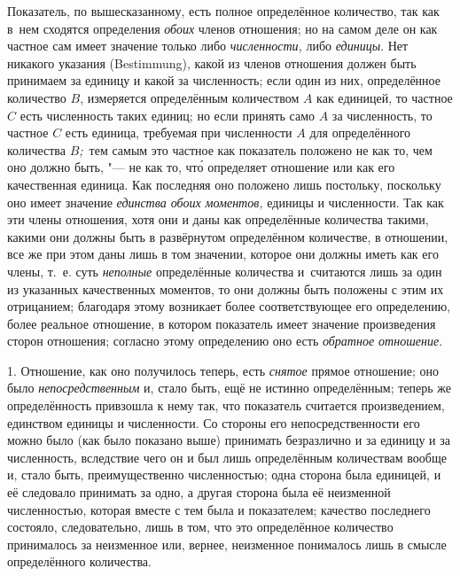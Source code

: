 Показатель, по вышесказанному, есть полное определённое количество, так как
в~нем сходятся определения {\em обоих} членов отношения; но на самом деле он
как частное сам имеет значение только либо {\em численности,} либо
{\em единицы}. Нет никакого указания (Bestimmung), какой из членов отношения
должен быть принимаем за единицу и какой за численность; если один из них,
определённое количество $B$, измеряется определённым количеством $A$ как
единицей, то частное $C$ есть численность таких единиц; но если принять само
$A$ за численность, то частное $C$ есть единица, требуемая при численности $A$
для определённого количества $B${\em ;\,} тем самым это частное как показатель
положено не как то, чем оно должно быть, "--- не как то, чт\'{о} определяет
отношение или как его качественная единица. Как последняя оно положено лишь
постольку, поскольку оно имеет значение {\em единства обоих моментов,} единицы
и численности. Так как эти члены отношения, хотя они и даны как определённые
количества такими, какими они должны быть в развёрнутом определённом
количестве, в отношении, все же при этом даны лишь в том значении, которое они
должны иметь как его члены, т.~е. суть {\em неполные} определённые количества
и~считаются лишь за один из указанных качественных моментов, то они должны быть
положены с этим их отрицанием; благодаря этому возникает более соответствующее
его определению, более реальное отношение, в котором показатель имеет значение
произведения сторон отношения; согласно этому определению оно есть
{\em обратное отношение}.


1. Отношение, как оно получилось теперь, есть {\em снятое} прямое отношение;
оно было {\em непосредственным} и, стало быть, ещё не истинно определённым;
теперь же определённость привзошла к нему так, что показатель считается
произведением, единством единицы и численности. Со стороны его
непосредственности его можно было (как было показано выше) принимать
безразлично и за единицу и за численность, вследствие чего он и был лишь
определённым количествам вообще и, стало быть, преимущественно численностью;
одна сторона была единицей, и её следовало принимать за одно, а другая сторона
была её неизменной численностью, которая вместе с тем была и показателем;
качество последнего состояло, следовательно, лишь в том, что это определённое
количество принималось за неизменное или, вернее, неизменное понималось лишь в
смысле определённого количества.

